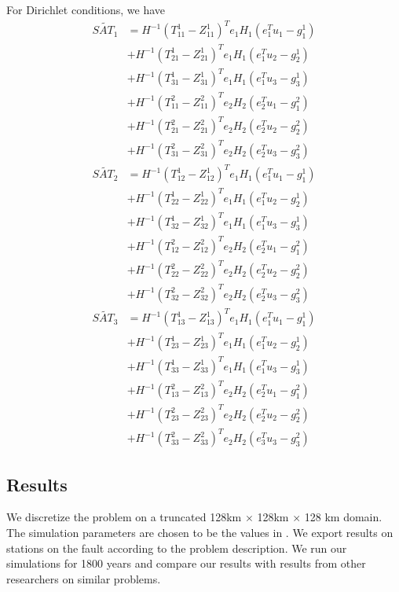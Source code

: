 For Dirichlet conditions, we have
\begin{align}
    \tilde{SAT_1} &= H^{-1} (T_{11}^1 - Z_{11}^1)^T e_1 H_1 (e_1^T u_1 - g_1^1) \nonumber \\
    &+ H^{-1} (T_{21}^1 - Z_{21}^1)^T e_1 H_1 (e_1^T u_2 - g_2^1) \nonumber\\ 
    &+ H^{-1} (T_{31}^1 - Z_{31}^1)^T e_1 H_1 (e_1^T u_3 - g_3^1) \nonumber\\
    &+ H^{-1} (T_{11}^2 - Z_{11}^2)^T e_2 H_2 (e_2^T u_1 - g_1^2) \nonumber\\
    &+ H^{-1} (T_{21}^2 - Z_{21}^2)^T e_2 H_2 (e_2^T u_2 - g_2^2) \nonumber\\
    &+ H^{-1} (T_{31}^2 - Z_{31}^2)^T e_2 H_2 (e_2^T u_3 - g_3^2) \\
    \tilde{SAT_2} &= H^{-1} (T_{12}^1 - Z_{12}^1)^T e_1 H_1 (e_1^T u_1 - g_1^1) \nonumber \\
    & + H^{-1} (T_{22}^1 - Z_{22}^1)^T e_1 H_1 (e_1^T u_2 - g_2^1) \nonumber \\
    & + H^{-1} (T_{32}^1 - Z_{32}^1)^T e_1 H_1 (e_1^T u_3 - g_3^1) \nonumber \\
    & + H^{-1} (T_{12}^2 - Z_{12}^2)^T e_2 H_2 (e_2^T u_1 - g_1^2) \nonumber \\
    & + H^{-1} (T_{22}^2 - Z_{22}^2)^T e_2 H_2 (e_2^T u_2 - g_2^2) \nonumber \\ 
    & + H^{-1} (T_{32}^2 - Z_{32}^2)^T e_2 H_2 (e_2^T u_3 - g_3^2) \\
    \tilde{SAT_3} &= H^{-1} (T_{13}^1 - Z_{13}^1)^T e_1 H_1 (e_1^T u_1 - g_1^1) \nonumber \\
    & + H^{-1} (T_{23}^1 - Z_{23}^1)^T e_1 H_1 (e_1^T u_2 - g_2^1) \nonumber \\ 
    & + H^{-1} (T_{33}^1 - Z_{33}^1)^T e_1 H_1 (e_1^T u_3 - g_3^1) \nonumber \\
    & + H^{-1} (T_{13}^2 - Z_{13}^2)^T e_2 H_2 (e_2^T u_1 - g_1^2) \nonumber \\
    & + H^{-1} (T_{23}^2 - Z_{23}^2)^T e_2 H_2 (e_2^T u_2 - g_2^2) \nonumber \\
    & + H^{-1} (T_{33}^2 - Z_{33}^2)^T e_2 H_2 (e_3^T u_3 - g_3^2)
    \label{eqn:dirichlet-condition}
\end{align}




\subsection{Results}
We discretize the problem on a truncated 128km $\times$ 128km $\times$ 128 km domain. The simulation parameters are chosen to be the values in \cite{jiang2020seas}. 
We export results on stations on the fault according to the problem description. We run our simulations for 1800 years and compare our results with results from other researchers on similar problems.

